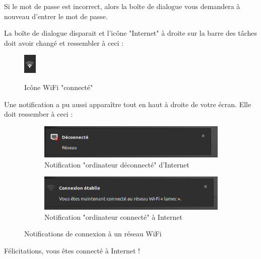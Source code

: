 \documentclass[12pt]{book}
\begin{document}
		Si le mot de passe est incorrect, alors la boîte de dialogue vous demandera à nouveau d'entrer le mot de passe.\par
		La boîte de dialogue disparait et l'icône "Internet" à droite sur la barre des tâches doit avoir changé et ressembler à ceci :
		\begin{figure}[h]
			\centering
			\includegraphics{include/connect_wifi.png}
			\label{fig:iconeconnecte}
			\caption{Icône WiFi "connecté"}
		\end{figure}
		\newline
		Une notification a pu aussi apparaître tout en haut à droite de votre écran.
		Elle doit ressember à ceci :
		\begin{figure}[h]
		\centering
			\begin{subfigure}{.51\textwidth}
				\centering
				\includegraphics[width=\textwidth]{include/notif_deco.png}
				\caption{Notification "ordinateur déconnecté" d'Internet}
				\label{fig:notif_deco_wifi}
			\end{subfigure}
			\begin{subfigure}{.48\textwidth}
				\centering
				\includegraphics[width=\textwidth]{include/notif_wifi.png}
				\caption{Notification "ordinateur connecté" à Internet}
				\label{fig:notif_co_wifi}
			\end{subfigure}
			\caption{Notifications de connexion à un réseau WiFi}
			\label{fig:notif_wifi}
		\end{figure}\par
		Félicitations, vous êtes connecté à Internet !
\end{document}
